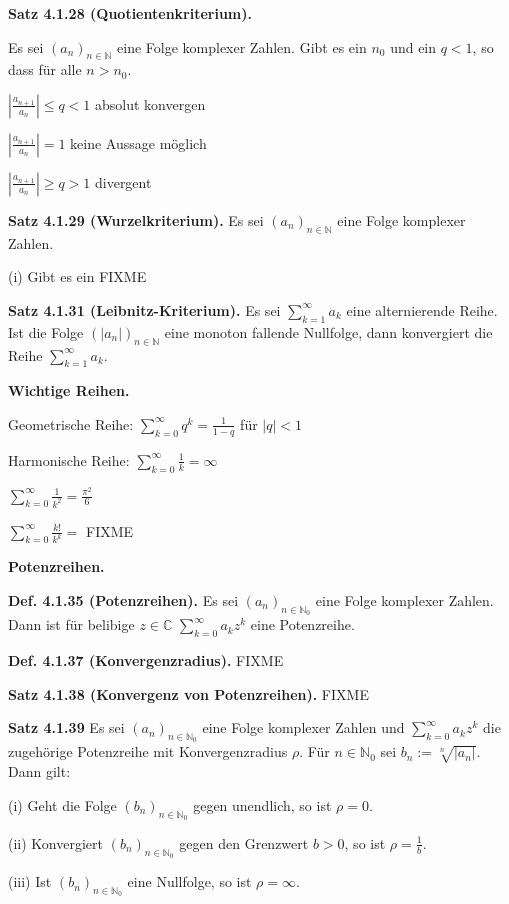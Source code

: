 \documentclass[ngerman]{article}
\begin{document}
\begin{multicols}{4}
\begin{tiny}
\textbf{Satz 4.1.28 (Quotientenkriterium).}

Es sei $(a_n)_{n\in \mathbb N}$ eine Folge komplexer Zahlen. Gibt es ein $n_0$ und ein $q<1$, so dass für alle $n>n_0$.

$\left|\frac{a_{n+1}}{a_n}\right| \le q<1$ absolut konvergen

$\left|\frac{a_{n+1}}{a_n}\right| = 1$ keine Aussage möglich

$\left|\frac{a_{n+1}}{a_n}\right| \ge q > 1$ divergent

\textbf{Satz 4.1.29 (Wurzelkriterium).} Es sei $(a_n)_{n \in \mathbb N}$ eine Folge komplexer Zahlen.

(i) Gibt es ein FIXME

\textbf{Satz 4.1.31 (Leibnitz-Kriterium).} Es sei $\sum_{k=1}^\infty a_k$ eine alternierende Reihe. Ist die Folge $(\vert a_n \vert )_{n \in \mathbb N}$ eine monoton fallende Nullfolge, dann konvergiert die Reihe $\sum_{k=1}^\infty a_k$.

\textbf{Wichtige Reihen.}

Geometrische Reihe: $\sum_{k=0}^\infty q^k = \frac{1}{1-q}$ für $\vert q \vert < 1$

Harmonische Reihe: $\sum_{k=0}^\infty \frac{1}{k} = \infty$

$\sum_{k=0}^\infty \frac{1}{k^2} = \frac{\pi^2}{6}$

$\sum_{k=0}^\infty \frac{k!}{k^k} =$ FIXME


\textbf{Potenzreihen.}

\textbf{Def. 4.1.35 (Potenzreihen).} Es sei $(a_n)_{n \in \mathbb N_0}$ eine Folge komplexer Zahlen. Dann ist für belibige $z \in \mathbb C$ $\sum_{k=0}^\infty a_k z^k$ eine Potenzreihe.

\textbf{Def. 4.1.37 (Konvergenzradius).} FIXME

\textbf{Satz 4.1.38 (Konvergenz von Potenzreihen).} FIXME

\textbf{Satz 4.1.39} Es sei $(a_n)_{n \in \mathbb N_0}$ eine Folge komplexer Zahlen und $\sum_{k=0}^\infty a_k z^k$ die zugehörige Potenzreihe mit Konvergenzradius $\rho$. Für $n \in \mathbb N_0$ sei $b_n := \sqrt[n]{\vert a_n \vert}$. Dann gilt:

(i) Geht die Folge $(b_n)_{n \in \mathbb N_0}$ gegen unendlich, so ist $\rho = 0$.

(ii) Konvergiert $(b_n)_{n \in \mathbb N_0}$ gegen den Grenzwert $b > 0$, so ist $\rho = \frac{1}{b}$.

(iii) Ist $(b_n)_{n \in \mathbb N_0}$ eine Nullfolge, so ist $\rho = \infty$.


\end{tiny}
\end{multicols}
\end{document}
